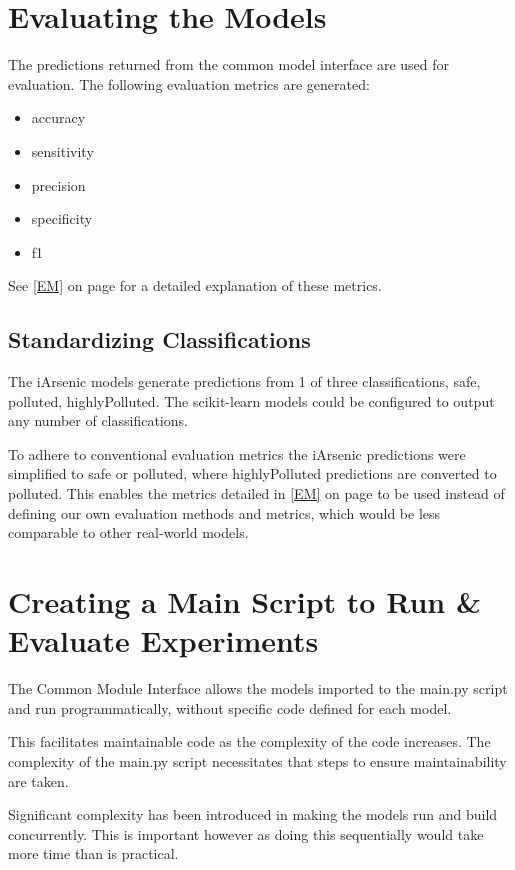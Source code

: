 \section{Evaluating the Models}

The predictions returned from the common model interface are used for evaluation. The following evaluation metrics are generated:
\begin{itemize}
  \item accuracy
  \item sensitivity 
  \item precision 
  \item specificity 
  \item f1
\end{itemize}

See \ref{EM} on page \pageref{EM} for a detailed explanation of these metrics.

\subsection{Standardizing Classifications}

The iArsenic models generate predictions from 1 of three classifications, safe, polluted, highlyPolluted. The scikit-learn models could be configured to output any number of classifications.

To adhere to conventional evaluation metrics the iArsenic predictions were simplified to safe or polluted, where highlyPolluted predictions are converted to polluted. This enables the metrics detailed in \ref{EM} on page \pageref{EM} to be used instead of defining our own evaluation methods and metrics, which would be less comparable to other real-world models.

\section{Creating a Main Script to Run \& Evaluate Experiments}

The Common Module Interface allows the models imported to the main.py script and run programmatically, without specific code defined for each model. 

This facilitates maintainable code as the complexity of the code increases. The complexity of the main.py script necessitates that steps to ensure maintainability are taken. 

Significant complexity has been introduced in making the models run and build concurrently. This is important however as doing this sequentially would take more time than is practical.

